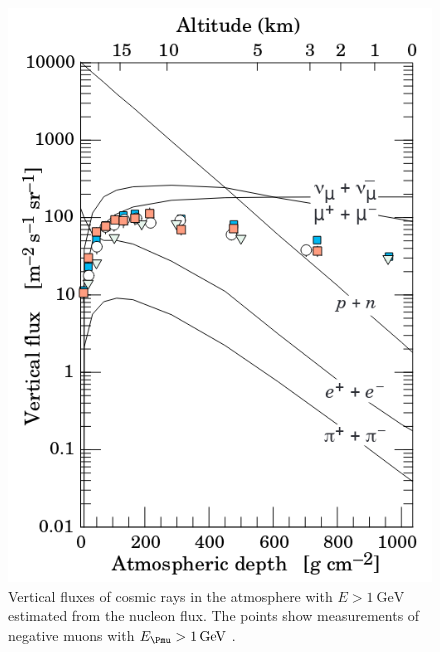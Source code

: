\begin{figure}[htbp]
\centering
\includegraphics[width=0.5\linewidth]{./fig/cosflux.png}
\caption{Vertical fluxes of cosmic rays in the atmosphere with $E>\SI{1}{\GeV}$ estimated from the nucleon flux. The points show measurements of negative muons with $E_{\Pmu} > \SI{1}{\GeV}$ \cite{Tanabashi:2018oca}.}
\label{fig:cosflux}
\end{figure}


